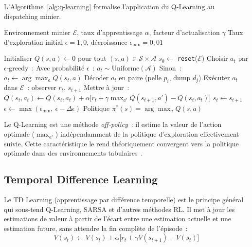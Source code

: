 \documentclass[11pt,a4paper]{report}
\begin{document}
L'Algorithme~\ref{alg:q-learning} formalise l'application du Q-Learning au dispatching minier.

\begin{algorithm}[H]
\caption{Q-Learning pour le dispatching minier}
\label{alg:q-learning}
\begin{algorithmic}[1]

\REQUIRE Environnement minier $\mathcal{E}$, taux d'apprentissage $\alpha$, facteur d'actualisation $\gamma$
\REQUIRE Taux d'exploration initial $\epsilon = 1{,}0$, décroissance $\epsilon_{\min} = 0{,}01$

\STATE Initialiser $Q(s, a) \leftarrow 0$ pour tout $(s, a) \in \mathcal{S} \times \mathcal{A}$
    \STATE $s_0 \leftarrow$ \texttt{reset}($\mathcal{E}$) 
        \STATE Choisir $a_t$ par $\epsilon$-greedy~:
        \STATE \hspace{1em} Avec probabilité $\epsilon$~: $a_t \sim \text{Uniforme}(\mathcal{A})$ 
        \STATE \hspace{1em} Sinon~: $a_t \leftarrow \arg\max_a Q(s_t, a)$ 
        \STATE Décoder $a_t$ en paire (pelle $p_i$, dump $d_j$)
        \STATE Exécuter $a_t$ dans $\mathcal{E}$~: observer $r_t$, $s_{t+1}$
        \STATE Mettre à jour~:
        \STATE \hspace{1em} $Q(s_t, a_t) \leftarrow Q(s_t, a_t) + \alpha \big[ r_t + \gamma \max_{a'} Q(s_{t+1}, a') - Q(s_t, a_t) \big]$
        \STATE $s_t \leftarrow s_{t+1}$
    \ENDWHILE
    \STATE $\epsilon \leftarrow \max(\epsilon_{\min},\ \epsilon - \Delta\epsilon)$ 
\ENDFOR
\RETURN Politique $\pi^*(s) = \arg\max_a Q(s, a)$

\end{algorithmic}
\end{algorithm}

Le Q-Learning est une méthode \emph{off-policy}~: il estime la valeur de l'action optimale ($\max_{a'}$) indépendamment de la politique d'exploration effectivement suivie. Cette caractéristique le rend théoriquement convergent vers la politique optimale dans des environnements tabulaires~\cite{SuttonBarto2018}.

\subsection{Temporal Difference Learning}
\label{sec:td-learning}
Le TD Learning (apprentissage par différence temporelle) est le principe général qui sous-tend Q-Learning, SARSA et d'autres méthodes RL. Il met à jour les estimations de valeur à partir de l'écart entre une estimation actuelle et une estimation future, sans attendre la fin complète de l'épisode~:
\begin{equation}
    V(s_t) \leftarrow V(s_t) + \alpha \Big[ r_t + \gamma V(s_{t+1}) - V(s_t) \Big]
    \label{eq:td-learning}
\end{equation}
\end{document}
